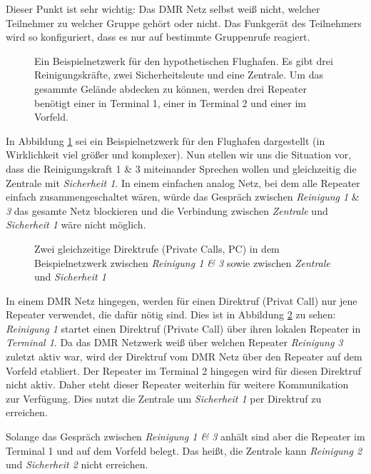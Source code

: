 \begin{merke}
 Dieser Punkt ist sehr wichtig: Das DMR Netz selbst weiß nicht, welcher Teilnehmer zu welcher Gruppe gehört oder nicht. Das Funkgerät des Teilnehmers wird so konfiguriert, dass es nur auf bestimmte Gruppenrufe reagiert.
\end{merke}

\begin{figure}[!ht]
 \centering
 
 \caption{Ein Beispielnetzwerk für den hypothetischen Flughafen. Es gibt drei Reinigungskräfte, zwei Sicherheitsleute und eine Zentrale. Um das gesammte Gelände abdecken zu können, werden drei Repeater benötigt einer in Terminal 1, einer in Terminal 2 und einer im Vorfeld.} \label{fig:exnet1}
\end{figure}

In Abbildung \ref{fig:exnet1} sei ein Beispielnetzwerk für den Flughafen dargestellt (in Wirklichkeit viel größer und komplexer). Nun stellen wir uns die Situation vor, dass die Reinigungskraft 1 \& 3 miteinander Sprechen wollen und gleichzeitig die Zentrale mit \emph{Sicherheit 1}. In einem einfachen analog Netz, bei dem alle Repeater einfach zusammengeschaltet wären, würde das Gespräch zwischen \emph{Reinigung 1} \& \emph{3} das gesamte Netz blockieren und die Verbindung zwischen \emph{Zentrale} und \emph{Sicherheit 1} wäre nicht möglich. 

\begin{figure}[!ht]
 \centering
 
 \caption{Zwei gleichzeitige Direktrufe (Private Calls, PC) in dem Beispielnetzwerk zwischen \emph{Reinigung 1 \& 3} sowie zwischen \emph{Zentrale} und \emph{Sicherheit 1}} \label{fig:exnet2}
\end{figure}

In einem DMR Netz hingegen, werden für einen Direktruf (Privat Call) nur jene Repeater verwendet, die dafür nötig sind. Dies ist in Abbildung \ref{fig:exnet2} zu sehen: \emph{Reinigung 1} startet einen Direktruf (Private Call) über ihren lokalen Repeater in \emph{Terminal 1}. Da das DMR Netzwerk weiß über welchen Repeater \emph{Reinigung 3} zuletzt aktiv war, wird der Direktruf vom DMR Netz über den Repeater auf dem Vorfeld etabliert. Der Repeater im Terminal 2 hingegen wird für diesen Direktruf nicht aktiv. Daher steht dieser Repeater weiterhin für weitere Kommunikation zur Verfügung. Dies nutzt die Zentrale um \emph{Sicherheit 1} per Direktruf zu erreichen. 

Solange das Gespräch zwischen \emph{Reinigung 1 \& 3} anhält sind aber die Repeater im Terminal 1 und auf dem Vorfeld belegt. Das heißt, die Zentrale kann \emph{Reinigung 2} und \emph{Sicherheit 2} nicht erreichen. 


